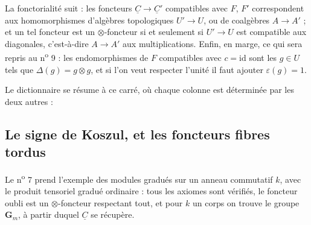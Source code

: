 \documentclass[11pt,a4paper]{article}
\begin{document}
La fonctorialité suit : les foncteurs $\underline{C} \to \underline{C}'$
compatibles avec $F$, $F'$ correspondent aux homomorphismes d'algèbres
topologiques $U' \to U$, ou de coalgèbres $A \to A'$ ; et un tel foncteur est
un $\otimes$-foncteur si et seulement si $U' \to U$ est compatible aux
diagonales, c'est-à-dire $A \to A'$ aux multiplications. Enfin, en marge, ce
qui sera repris au n\textsuperscript{o} 9 : les endomorphismes de $F$
compatibles avec $c = \mathrm{id}$ sont les $g \in U$ tels que $\Delta(g) = g
\otimes g$, et si l'on veut respecter l'unité il faut ajouter
$\varepsilon(g) = 1$.

Le dictionnaire se résume à ce carré, où chaque colonne est déterminée par les
deux autres :


\subsection*{Le signe de Koszul, et les foncteurs fibres tordus}

Le n\textsuperscript{o} 7 prend l'exemple des modules gradués sur un anneau
commutatif $k$, avec le produit tensoriel gradué ordinaire : tous les axiomes
sont vérifiés, le foncteur oubli est un $\otimes$-foncteur respectant tout, et
pour $k$ un corps on trouve le groupe $\mathbf{G}_{m}$, à partir duquel
$\underline{C}$ se récupère.
\end{document}
